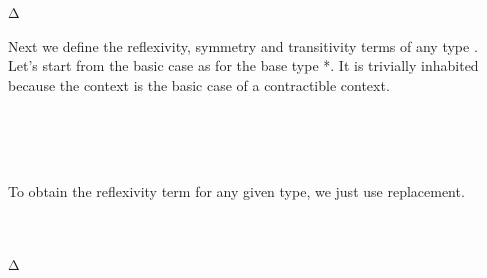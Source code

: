 \begin{code}\>\<%
\\
\> \AgdaSymbol{:} \AgdaSymbol{\{}  \AgdaSymbol{:} \AgdaSymbol{\}(} \AgdaSymbol{:}  \AgdaSymbol{)(} \AgdaSymbol{:}  \AgdaSymbol{)}      \AgdaSymbol{\{}  \AgdaSymbol{\}} \AgdaSymbol{(}  \AgdaSymbol{)}\<%
\\
\> \AgdaSymbol{\{}Δ \AgdaSymbol{=} \AgdaSymbol{\}}    \AgdaSymbol{=}  \AgdaSymbol{(}  \AgdaSymbol{)} \AgdaSymbol{(}  \AgdaSymbol{)} \AgdaSymbol{(}  \AgdaSymbol{)}\<%
\\
\>\<\end{code}

Next we define the reflexivity, symmetry and transitivity terms of any type . Let's start from the basic case as for the base type *. It is trivially inhabited because the context is the basic case of a contractible context.

\begin{code}\>\<%
\\
\> \AgdaSymbol{:}  \AgdaSymbol{\{}\AgdaSymbol{\}} \AgdaSymbol{(}    \AgdaSymbol{)}\<%
\\
\> \AgdaSymbol{=}  \<%
\\
\>\<\end{code}

\noindent To obtain the reflexivity term for any given type, we just  use replacement.

\begin{code}\>\<%
\\
\> \<[11]%
\>[11]\AgdaSymbol{:} \AgdaSymbol{\{} \AgdaSymbol{:} \AgdaSymbol{\}(} \AgdaSymbol{:}  \AgdaSymbol{)} \<[33]%
\>[33]\<%
\\
\>[0]\<[11]%
\>[11]  \AgdaSymbol{(} \AgdaSymbol{\{}Δ \AgdaSymbol{=} \AgdaSymbol{\}}  \AgdaSymbol{(}    \AgdaSymbol{))}\<%
\\
\>  \<[11]%
\>[11]\AgdaSymbol{=}   \<%
\\
\>\<\end{code}

